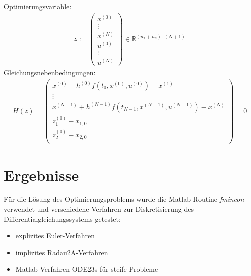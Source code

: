 Optimierungsvariable:
\begin{align}
z := 	\left(\begin{array}{c} 	 
							x^{(0)}\\
							\vdots\\
							x^{(N)}\\
							u^{(0)}\\
							\vdots\\
							u^{(N)}
						\end{array}\right) \in \mathbb{R}^{(n_x+n_u)\cdot(N+1)} 
\end{align}
Gleichungsnebenbedingungen:
\begin{align}
H(z) = \left(\begin{array}{c}
								x^{(0)} + h^{(0)}f(t_0,x^{(0)},u^{(0)})-x^{(1)}\\
								\vdots\\
								x^{(N-1)} + h^{(N-1)} f(t_{N-1},x^{(N-1)},u^{(N-1)})-x^{(N)}\\
								z_1^{(0)} - x_{1,0}\\
								z_2^{(0)} - x_{2,0}\\
							\end{array}\right) = 0
\end{align}

\section{Ergebnisse} \label{sec:ErgebnisseDisk}
Für die Lösung des Optimierungsproblems wurde die Matlab-Routine \textit{fmincon} verwendet und verschiedene Verfahren zur Diskretisierung des Differentialgleichungssystems getestet:
\begin{itemize}
	\item explizites Euler-Verfahren
	\item implizites Radau2A-Verfahren
	\item Matlab-Verfahren ODE23s für steife Probleme
\end{itemize}

